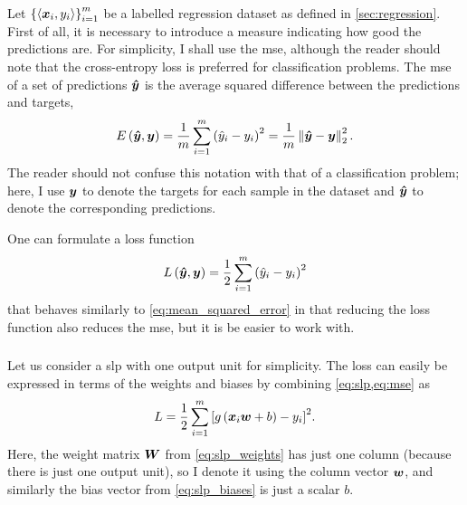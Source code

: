 \documentclass[../report.tex]{subfiles}
\begin{document}
Let $\left\{\langle {\bm{x}}_i, y_i \rangle \right\}_{i=1}^m$ be a labelled regression dataset as defined in \cref{sec:regression}.
First of all, it is necessary to introduce a measure indicating how good the predictions are.
For simplicity, I shall use the \gls{mse}, although the reader should note that the cross-entropy loss is preferred for classification problems.
The \gls{mse} of a set of predictions ${\bm{\hat{y}}}$ is the average squared difference between the predictions and targets,
\begin{equation}
    \label{eq:mean_squared_error}
    E\left( {\bm{\hat{y}}}, {\bm{y}} \right) = \frac{1}{m} \sum_{i=1}^m{\left(\hat{y}_i - y_i\right)^2} = \frac{1}{m} \left\lVert{\bm{\hat{y}}}-{\bm{y}}\right\rVert_2^2.
\end{equation}
The reader should not confuse this notation with that of a classification problem; here, I use ${\bm{y}}$ to denote the targets for each sample in the dataset and ${\bm{\hat{y}}}$ to denote the corresponding predictions.

One can formulate a loss function
\begin{equation}
    \label{eq:mse}
    L\left( {\bm{\hat{y}}}, {\bm{y}} \right) = \frac{1}{2} \sum_{i=1}^m{\left(\hat{y}_i - y_i\right)^2}
\end{equation}
that behaves similarly to \cref{eq:mean_squared_error} in that reducing the loss function also reduces the \gls{mse}, but it is be easier to work with.

\subsubsection{}
Let us consider a \gls{slp} with one output unit for simplicity. 
The loss can easily be expressed in terms of the weights and biases by combining \cref{eq:slp,eq:mse} as
\begin{equation}
    L = \frac{1}{2} \sum_{i=1}^m{\left[g\left(
        {\bm{x}}_i {\bm{w}} + b
    \right) - y_i\right]^2}.
\end{equation}
Here, the weight matrix ${\bm{W}}$ from \cref{eq:slp_weights} has just one column (because there is just one output unit), so I denote it using the column vector ${\bm{w}}$, and similarly the bias vector from \cref{eq:slp_biases} is just a scalar $b$.
\end{document}
